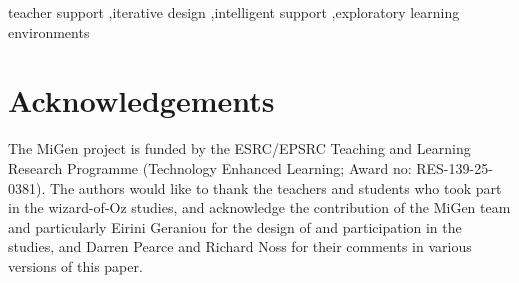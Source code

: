 \documentclass[authoryear,preprint,12pt]{elsarticle}
\begin{document}
\begin{frontmatter}
\begin{keyword}
     teacher support 
\sep iterative design 
\sep intelligent support 
\sep exploratory learning environments
\end{keyword}

\end{frontmatter}












\section*{Acknowledgements} 

The MiGen project is funded by the ESRC/EPSRC Teaching and
Learning Research Programme (Technology Enhanced Learning; Award no:
RES-139-25-0381). The authors would
like to thank the teachers and students who took part in the
wizard-of-Oz studies, and acknowledge the contribution of the MiGen team and
particularly Eirini Geraniou for the design of and
 participation in the studies, and Darren Pearce and Richard Noss for their comments in various versions of this paper. 




\end{document}
